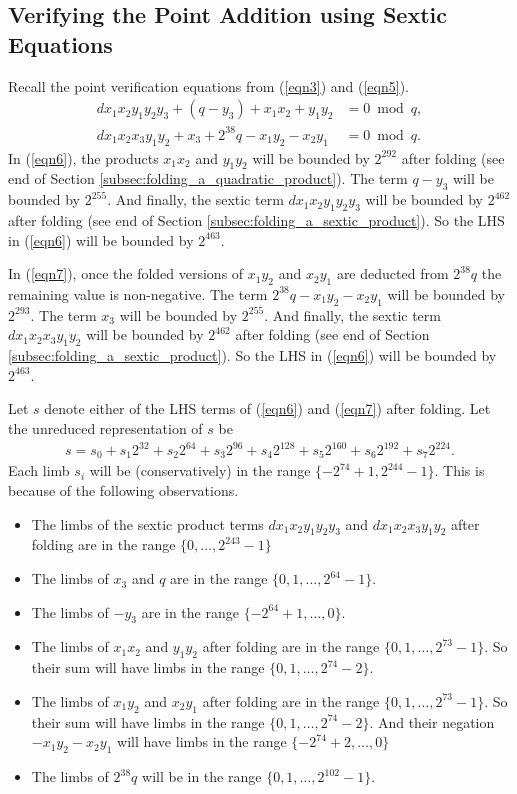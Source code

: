 \documentclass[a4paper, 12pt]{article}
\begin{document}
\subsection{Verifying the Point Addition using Sextic Equations}%
\label{subsec:verifying_the_point_addition_sextic_equations}
Recall the point verification equations from (\ref{eqn3}) and (\ref{eqn5}).
\begin{align}
  dx_1x_2y_1y_2y_3 + (q - y_3) + x_1x_2 + y_1y_2 &= 0 \bmod q,\label{eqn6}\\
  dx_1x_2x_3y_1y_2 + x_3 + 2^{38}q - x_1y_2 - x_2y_1  &= 0 \bmod q.\label{eqn7}
\end{align}
In (\ref{eqn6}), the products $x_1x_2$ and $y_1y_2$ will be bounded by $2^{292}$ after folding (see end of Section \ref{subsec:folding_a_quadratic_product}). The term $q-y_3$ will be bounded by $2^{255}$. And finally, the sextic term $dx_1x_2y_1y_2y_3$ will be bounded by $2^{462}$ after folding (see end of Section \ref{subsec:folding_a_sextic_product}). So the LHS in (\ref{eqn6}) will be bounded by $2^{463}$.

In (\ref{eqn7}), once the folded versions of $x_1y_2$ and $x_2y_1$ are deducted from $2^{38}q$ the remaining value is non-negative. The term $2^{38}q-x_1y_2-x_2y_1$ will be bounded by $2^{293}$. The term $x_3$ will be bounded by $2^{255}$. And finally, the sextic term $dx_1x_2x_3y_1y_2$ will be bounded by $2^{462}$ after folding (see end of Section \ref{subsec:folding_a_sextic_product}). So the LHS in (\ref{eqn6}) will be bounded by $2^{463}$.

Let $s$ denote either of the LHS terms of (\ref{eqn6}) and (\ref{eqn7}) after folding. Let the unreduced representation of $s$ be
\begin{align*}
  s = s_0 + s_1 2^{32} + s_2 2^{64} + s_3 2^{96} + s_4 2^{128} + s_5 2^{160} + s_6 2^{192} + s_7 2^{224}.
\end{align*}
Each limb $s_i$ will be (conservatively) in the range $\{-2^{74}+1, 2^{244}-1\}$. This is because of the following observations.
\begin{itemize}
  \item The limbs of the sextic product terms $dx_1x_2y_1y_2y_3$ and $dx_1x_2x_3y_1y_2$ after folding are in the range $\{0,\ldots,2^{243}-1\}$
  \item The limbs of $x_3$ and $q$ are in the range $\{0,1,\ldots,2^{64}-1\}$.
  \item The limbs of $-y_3$ are in the range $\{-2^{64}+1,\ldots,0\}$.
  \item The limbs of $x_1x_2$ and $y_1y_2$ after folding are in the range $\{0,1,\ldots,2^{73}-1\}$. So their sum will have limbs in the range $\{0,1,\ldots,2^{74}-2\}$.
  \item The limbs of $x_1y_2$ and $x_2y_1$ after folding are in the range $\{0,1,\ldots,2^{73}-1\}$. So their sum will have limbs in the range $\{0,1,\ldots,2^{74}-2\}$. And their negation $-x_1y_2-x_2y_1$ will have limbs in the range $\{-2^{74}+2,\ldots,0\}$
  \item The limbs of $2^{38}q$ will be in the range $\{0,1,\ldots,2^{102}-1\}$.
\end{itemize}
\end{document}
